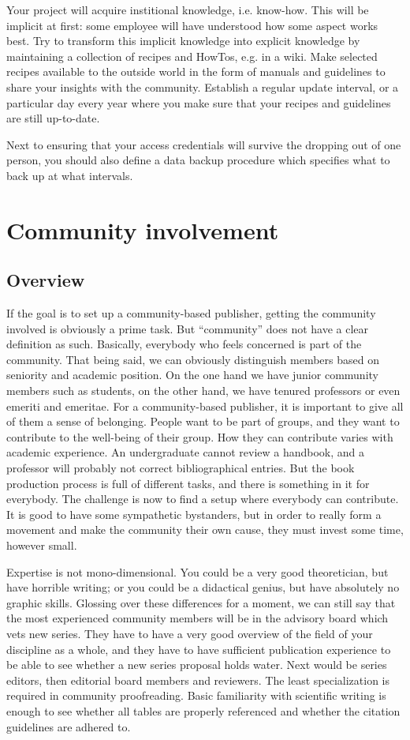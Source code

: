 \documentclass[nonflat,modfonts,output=book] {langsci/langscibook}
\begin{document}
Your project will acquire institional knowledge, i.e. know-how. This will be implicit at first: some employee will have understood how some aspect works best. Try to transform this implicit knowledge into explicit knowledge by maintaining a collection of recipes and HowTos, e.g. in  a wiki. Make selected recipes available to the outside world in the form of manuals and guidelines to share your insights with the community. Establish a regular update interval, or a particular day every year where you make sure that your recipes and guidelines are still up-to-date. 

Next to ensuring that your access credentials will survive the dropping out of one person, you should also define a data backup procedure which specifies what to back up at what intervals. 


\section{Community involvement}\label{sec:community}
\subsection{Overview}
If the goal is to set up a community-based publisher, getting the community involved is obviously a prime task. But ``community'' does not have a clear definition as such. Basically, everybody who feels concerned is part of the community. That being said, we can obviously distinguish members based on seniority and academic position. On the one hand we have junior community members such as students, on the other hand, we have tenured professors or even emeriti and emeritae. For a community-based publisher, it is important to give all of them a sense of belonging.  People want to be part of groups, and they want to contribute to the well-being of their group. How they can contribute varies with academic experience. An undergraduate cannot review a handbook, and a professor will probably not correct bibliographical entries. But the book production process is full of different tasks, and there is something in it for everybody. The challenge is now to find a setup where everybody can contribute. It is good to have some sympathetic bystanders, but in order to really form a movement and make the community their own cause, they must invest some time, however small. 

Expertise is not mono-dimensional. You could be a very good theoretician, but have horrible writing; or you could be a didactical genius, but have absolutely no graphic skills. Glossing over these differences for a moment, we can still say that the most experienced community members will be in the advisory board which vets new series. They have to have a very good overview of the field of your discipline as a whole, and they have to have sufficient publication experience to be able to see whether a new series proposal holds water. Next would be series editors, then editorial board members and reviewers. The least specialization is required in community proofreading. Basic familiarity with scientific writing is enough to see whether all tables are properly referenced and whether the citation guidelines are adhered to. 
\end{document}
